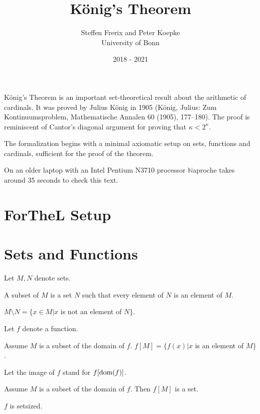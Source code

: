 \documentclass{article}
\title{König's Theorem}
\author{Steffen Frerix and Peter Koepke\\
University of Bonn}
\date{2018 - 2021}
\newcommand{\Naproche}{$\mathbb{N}$aproche}
\begin{document}
  \maketitle

König's Theorem is an important set-theoretical result about the
arithmetic of cardinals. It was proved by Julius König in 1905
(König, Julius: Zum Kontinuumsproblem, Mathematische Annalen 60 (1905), 177–180).
The proof is reminiscent of Cantor's diagonal argument for
proving that $\kappa < 2^\kappa$.

The formalization begins with a minimal axiomatic setup on sets, functions
and cardinals, sufficient for the proof of the theorem.

On an older laptop
with an Intel Pentium N3710 processor \Naproche{} takes
around 35 seconds to check this text.

\section{ForTheL Setup}

\begin{forthel}
\end{forthel}


\section{Sets and Functions}

\begin{forthel}
    Let $M,N$ denote sets.

    \begin{definition}
     A subset of $M$ is a set $N$ such that every element
     of $N$ is an element of $M$.
    \end{definition}

    \begin{definition}
      $M \setminus N = \{x \in M | x$ is not an element of $N\}$.
    \end{definition}

    Let $f$ denote a function.

    \begin{definition}
      Assume $M$ is a subset of the domain of $f$.
      $f[M] = \{f(x) | x$ is an element of $M\}$.
    \end{definition}

    Let the image of $f$ stand for $f[\operatorname{dom}(f)]$.

    \begin{axiom}
      Assume $M$ is a subset of the domain of $f$.
      Then $f[M]$ is a set.
    \end{axiom}

    \begin{axiom}
      $f$ is setsized.
    \end{axiom}
\end{forthel}
\end{document}

